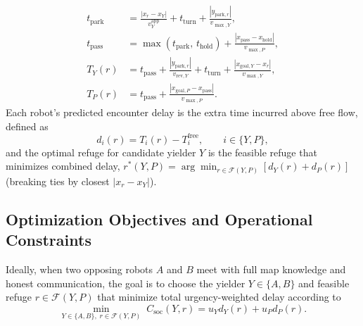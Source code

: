 \begin{equation}
\begin{aligned}
t_{\mathrm{park}} &= \frac{|x_r - x_Y|}{v_Y^{\mathrm{app}}} + t_{\mathrm{turn}} + \frac{|y_{\mathrm{park},r}|}{v_{\max,Y}}, \\
t_{\mathrm{pass}} &= \max(t_{\mathrm{park}},\, t_{\mathrm{hold}}) + \frac{|x_{\mathrm{pass}} - x_{\mathrm{hold}}|}{v_{\max,P}}, \\
T_Y(r) &= t_{\mathrm{pass}} + \frac{|y_{\mathrm{park},r}|}{v_{\mathrm{rev},Y}} + t_{\mathrm{turn}} + \frac{|x_{\mathrm{goal},Y} - x_r|}{v_{\max,Y}}, \\
T_P(r) &= t_{\mathrm{pass}} + \frac{|x_{\mathrm{goal},P} - x_{\mathrm{pass}}|}{v_{\max,P}}.
\end{aligned}
\label{eq:timeline}
\end{equation}
Each robot's predicted encounter delay is the extra time incurred above free flow, defined as
\begin{equation}
d_i(r) = T_i(r) - T_i^{\mathrm{free}}, \qquad i \in \{Y, P\},
\label{eq:delay_def}
\end{equation}
and the optimal refuge for candidate yielder $Y$ is the feasible refuge that minimizes combined delay, $r^\ast(Y, P) = \arg\min_{r \in \mathcal{F}(Y, P)} [d_Y(r) + d_P(r)]$ (breaking ties by closest $|x_r - x_Y|$).

\subsection{Optimization Objectives and Operational Constraints}
Ideally, when two opposing robots $A$ and $B$ meet with full map knowledge and honest communication, the goal is to choose the yielder $Y \in \{A, B\}$ and feasible refuge $r \in \mathcal{F}(Y, P)$ that minimize total urgency-weighted delay according to
\begin{equation}
\min_{Y \in \{A, B\},\; r \in \mathcal{F}(Y, P)} \; C_{\mathrm{soc}}(Y, r) = u_Y d_Y(r) + u_P d_P(r).
\label{eq:social_obj}
\end{equation}

